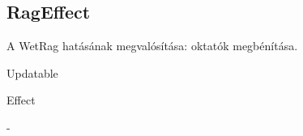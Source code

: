 \subsection{RagEffect}
\begin{class-template-responsibility}
    A WetRag hatásának megvalósítása: oktatók megbénítása.
\end{class-template-responsibility}
\begin{class-template-interface}
    Updatable
\end{class-template-interface}
\begin{class-template-baseclass}
    Effect
\end{class-template-baseclass}
\begin{class-template-attribute}
    -
\end{class-template-attribute}
\begin{class-template-method}
\end{class-template-method}

